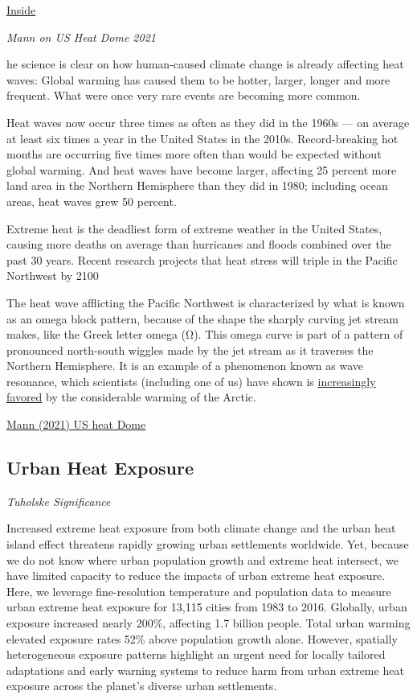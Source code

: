 \documentclass[
]{book}
\begin{document}
\href{https://insideclimatenews.org/news/16052021/extreme-heat-risks-climate-change/}{Inside}

\emph{Mann on US Heat Dome 2021}

he science is clear on how human-caused climate change is already affecting heat waves: Global warming has caused them to be hotter, larger, longer and more frequent. What were once very rare events are becoming more common.

Heat waves now occur three times as often as they did in the 1960s --- on average at least six times a year in the United States in the 2010s. Record-breaking hot months are occurring five times more often than would be expected without global warming. And heat waves have become larger, affecting 25 percent more land area in the Northern Hemisphere than they did in 1980; including ocean areas, heat waves grew 50 percent.

Extreme heat is the deadliest form of extreme weather in the United States, causing more deaths on average than hurricanes and floods combined over the past 30 years. Recent research projects that heat stress will triple in the Pacific Northwest by 2100

The heat wave afflicting the Pacific Northwest is characterized by what is known as an omega block pattern, because of the shape the sharply curving jet stream makes, like the Greek letter omega (Ω). This omega curve is part of a pattern of pronounced north-south wiggles made by the jet stream as it traverses the Northern Hemisphere. It is an example of a phenomenon known as wave resonance, which scientists (including one of us) have shown is \href{https://news.psu.edu/story/545128/2018/10/31/research/controlling-future-summer-weather-extremes-still-within-our-grasp}{increasingly favored} by the considerable warming of the Arctic.

\href{https://www.nytimes.com/2021/06/29/opinion/heat-dome-climate-change.html}{Mann (2021) US heat Dome}

\hypertarget{urban-heat-exposure}{%
\subsection{Urban Heat Exposure}\label{urban-heat-exposure}}

\emph{Tuholske Significance}

Increased extreme heat exposure from both climate change and the urban heat island effect threatens rapidly growing urban settlements worldwide. Yet, because we do not know where urban population growth and extreme heat intersect, we have limited capacity to reduce the impacts of urban extreme heat exposure. Here, we leverage fine-resolution temperature and population data to measure urban extreme heat exposure for 13,115 cities from 1983 to 2016. Globally, urban exposure increased nearly 200\%, affecting 1.7 billion people. Total urban warming elevated exposure rates 52\% above population growth alone. However, spatially heterogeneous exposure patterns highlight an urgent need for locally tailored adaptations and early warning systems to reduce harm from urban extreme heat exposure across the planet's diverse urban settlements.
\end{document}
